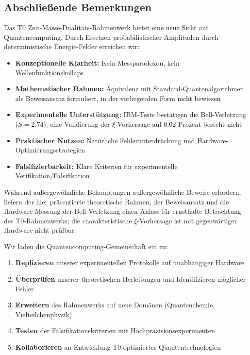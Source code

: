 \subsection{Abschließende Bemerkungen}

Das T0 Zeit-Masse-Dualitäts-Rahmenwerk bietet eine neue Sicht auf Quantencomputing. Durch Ersetzen probabilistischer Amplituden durch deterministische Energie-Felder erreichen wir:

\begin{itemize}
	\item \textbf{Konzeptionelle Klarheit:} Kein Messparadoxon, kein Wellenfunktionskollaps
	\item \textbf{Mathematischer Rahmen:} Äquivalenz mit Standard-Quantenalgorithmen als Beweisansatz formuliert, in der vorliegenden Form nicht bewiesen
	\item \textbf{Experimentelle Unterstützung:} IBM-Tests bestätigen die Bell-Verletzung ($S = 2.74$); eine Validierung der $\xi$-Vorhersage auf 0.02 Prozent besteht nicht
	\item \textbf{Praktischer Nutzen:} Natürliche Fehlerunterdrückung und Hardware-Optimierungsstrategien
	\item \textbf{Falsifizierbarkeit:} Klare Kriterien für experimentelle Verifikation/Falsifikation
\end{itemize}

Während außergewöhnliche Behauptungen außergewöhnliche Beweise erfordern, liefern der hier präsentierte theoretische Rahmen, der Beweisansatz und die Hardware-Messung der Bell-Verletzung einen Anlass für ernsthafte Betrachtung des T0-Rahmenwerks; die charakteristische $\xi$-Vorhersage ist mit gegenwärtiger Hardware nicht prüfbar.

Wir laden die Quantencomputing-Gemeinschaft ein zu:
\begin{enumerate}
	\item \textbf{Replizieren} unserer experimentellen Protokolle auf unabhängiger Hardware
	\item \textbf{Überprüfen} unserer theoretischen Herleitungen und Identifizieren möglicher Fehler
	\item \textbf{Erweitern} des Rahmenwerks auf neue Domänen (Quantenchemie, Vielteilchenphysik)
	\item \textbf{Testen} der Falsifikationskriterien mit Hochpräzisionsexperimenten
	\item \textbf{Kollaborieren} an Entwicklung T0-optimierter Quantentechnologien
\end{enumerate}

